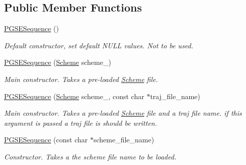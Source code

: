 \subsection*{Public Member Functions}
\begin{DoxyCompactItemize}
\item 
\mbox{\label{class_p_g_s_e_sequence_a29db64fbd60c54c191e8197e1818dce0}} 
\hyperlink{class_p_g_s_e_sequence_a29db64fbd60c54c191e8197e1818dce0}{P\+G\+S\+E\+Sequence} ()
\begin{DoxyCompactList}\small\item\em Default constructor, set default N\+U\+LL values. Not to be used. \end{DoxyCompactList}\item 
\mbox{\label{class_p_g_s_e_sequence_a31bcb2e91e27823bbe71904e180f7de9}} 
\hyperlink{class_p_g_s_e_sequence_a31bcb2e91e27823bbe71904e180f7de9}{P\+G\+S\+E\+Sequence} (\hyperlink{class_scheme}{Scheme} scheme\+\_\+)
\begin{DoxyCompactList}\small\item\em Main constructor. Takes a pre-\/loaded \hyperlink{class_scheme}{Scheme} file. \end{DoxyCompactList}\item 
\mbox{\label{class_p_g_s_e_sequence_ab278a413c31a67f82712590897a556cb}} 
\hyperlink{class_p_g_s_e_sequence_ab278a413c31a67f82712590897a556cb}{P\+G\+S\+E\+Sequence} (\hyperlink{class_scheme}{Scheme} scheme\+\_\+, const char $\ast$traj\+\_\+file\+\_\+name)
\begin{DoxyCompactList}\small\item\em Main constructor. Takes a pre-\/loaded \hyperlink{class_scheme}{Scheme} file and a traj file name. if this argument is passed a traj file is should be written. \end{DoxyCompactList}\item 
\mbox{\label{class_p_g_s_e_sequence_a262f1156c51983fba9b9a6b666dd2e07}} 
\hyperlink{class_p_g_s_e_sequence_a262f1156c51983fba9b9a6b666dd2e07}{P\+G\+S\+E\+Sequence} (const char $\ast$scheme\+\_\+file\+\_\+name)
\begin{DoxyCompactList}\small\item\em Constructor. Takes a the scheme file name to be loaded. \end{DoxyCompactList}\item 

\end{DoxyCompactItemize}

